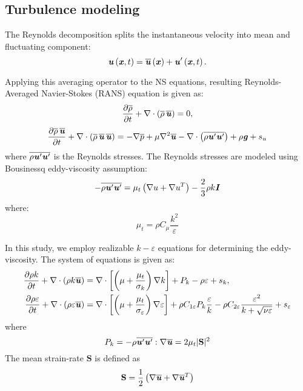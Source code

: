 \subsection*{Turbulence modeling}

The Reynolds decomposition splits the instantaneous velocity into mean and fluctuating component:
\begin{equation}
\textbf{\textit{u}} \left(\textbf{\textit{x}},t\right) = \overline{\textbf{\textit{u}}} \left(\textbf{\textit{x}}\right) + \textbf{\textit{u}}' \left(\textbf{\textit{x}},t\right).
\end{equation}

Applying this averaging operator to the NS equations, resulting Reynolds-Averaged Navier-Stokes (RANS) equation is given as:
\begin{equation}
\frac{\partial \overline{\rho}}{\partial t} + \nabla \cdot \left(\overline{\rho}\,\overline{\textbf{\textit{u}}}\right) = 0,
\end{equation}
\begin{equation}
\frac{\partial \overline{\rho}\,\overline{\textbf{\textit{u}}}}{\partial t}  + \nabla \cdot \left(\overline{\rho}\,\overline{\textbf{\textit{u}}}\,\overline{\textbf{\textit{u}}}\right) = -\nabla \overline{p} + \mu \nabla^2 \overline{\textbf{\textit{u}}} - \nabla \cdot \left(\overline{\rho \textbf{\textit{u}}' \textbf{\textit{u}}'}\right)+ \rho \textbf{\textit{g}} + s_u
\end{equation}
where $\overline{\rho \textbf{\textit{u}}' \textbf{\textit{u}}'}$ is the Reynolds stresses. The Reynolds stresses are modeled using Bousinessq eddy-viscosity assumption:
\begin{equation}
- \overline{\rho \textbf{\textit{u}}' \textbf{\textit{u}}'} = \mu_t \left(\nabla u + \nabla u^T\right) - \frac{2}{3}\rho k \textbf{\textit{I}}
\end{equation}
where:
\begin{equation}
\mu_t = \rho C_\mu \frac{k^2}{\varepsilon}
\end{equation}

In this study, we employ realizable $k-\varepsilon$ equations for determining the eddy-viscosity. The system of equations is given as:
\begin{align}
\frac{{\partial \rho k}}{{\partial t}} + \nabla \cdot \left(\rho k \overline{\textbf{\textit{u}}} \right)   &= \nabla  \cdot \left[ {\left( {\mu  + \frac{{{\mu _t}}}{{{\sigma _k}}}} \right)\nabla k} \right] + {P_k} - \rho \varepsilon  + s_k,\\
\frac{{\partial \rho \varepsilon }}{{\partial t}} +  \nabla \cdot \left(\rho \varepsilon \overline{\textbf{\textit{u}}} \right) &= \nabla  \cdot \left[ {\left( {\mu  + \frac{{{\mu _t}}}{{{\sigma _\varepsilon }}}} \right)\nabla \varepsilon } \right] + \rho{C_{1\varepsilon }}{P_k}\frac{\varepsilon }{k} - \rho{C_{2\varepsilon }}\frac{{{\varepsilon ^2}}}{{k + \sqrt {\nu \varepsilon } }} + s_\varepsilon
\label{eq:realizablekepsilon2}
\end{align}
where 
\begin{equation}
P_k = - \rho \overline{\textbf{\textit{u}}'\textbf{\textit{u}}'}:\nabla \overline{\textbf{\textit{u}}} = 2 \mu_t |\mathbf{S}|^2
\end{equation}
The mean strain-rate $\mathbf{S}$ is defined as
\begin{equation}
\mathbf{S} = \frac{1}{2} \left( \nabla \overline{\textbf{\textit{u}}} +  \nabla \overline{\textbf{\textit{u}}}^T \right)
\end{equation}

